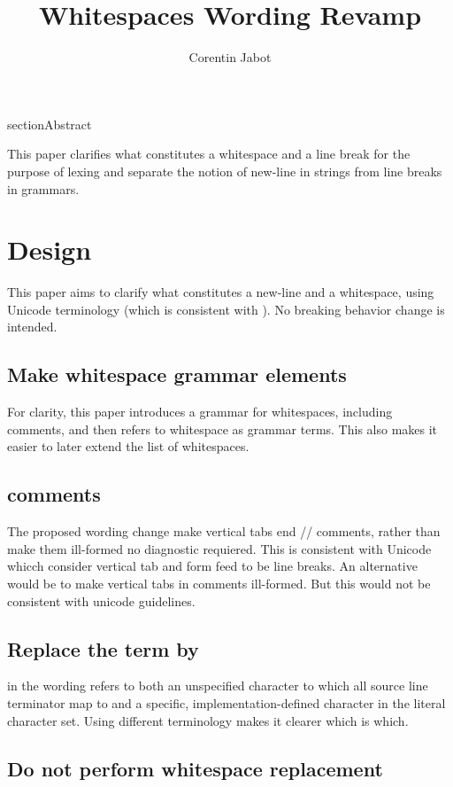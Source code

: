 \documentclass{wg21}
\title{Whitespaces Wording Revamp}
\author{Corentin Jabot}{corentin.jabot@gmail.com}
\begin{document}
\maketitle

section{Abstract}

This paper clarifies what constitutes a whitespace and a line break for the purpose of lexing and
separate the notion of new-line in strings from line breaks in grammars.

\section{Design}

This paper aims to clarify what constitutes a new-line and a whitespace, using Unicode terminology (which is consistent with ).
No breaking behavior change is intended.

\subsection{Make whitespace grammar elements}

For clarity, this paper introduces a grammar for whitespaces, including comments, and then refers to whitespace as grammar terms.
This also makes it easier to later extend the list of whitespaces.

\subsection{comments}

The proposed wording change make vertical tabs end // comments, rather than make them ill-formed no diagnostic requiered.
This is consistent with Unicode whicch consider vertical tab and form feed to be line breaks.
An alternative would be to make vertical tabs in comments ill-formed. But this would not be consistent with unicode guidelines.

\subsection{Replace the term  by }

 in the wording refers to both an unspecified character to which all source line terminator map to and
a specific, implementation-defined character in the literal character set.
Using different terminology makes it clearer which is which. 

\subsection{Do not perform whitespace replacement}
\end{document}
